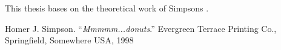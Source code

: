 \documentclass[12pt]{article}
\begin{document}
This thesis bases on the theoretical work of Simpsons \citep{Referenzname}.

\begin{thebibliography}{}
 Homer J. Simpson. ``\textit{Mmmmm...donuts}.''
  Evergreen Terrace Printing Co., Springfield, Somewhere USA, 1998
\end{thebibliography}
\end{document}
